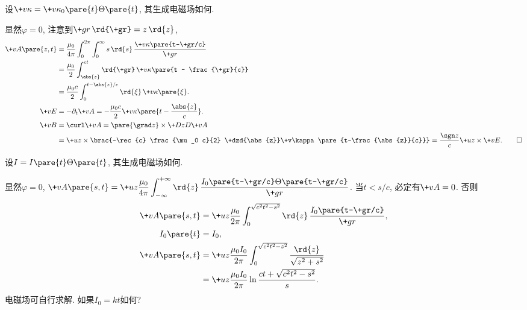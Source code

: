 \documentclass[hidelinks]{ctexart}
\begin{document}
\begin{sample}
    \begin{ex}
        设$\+v\kappa = \+v\kappa_0\pare{t}\Theta\pare{t}$, 其生成电磁场如何.
    \end{ex}
    \begin{solution}
        显然$\varphi = 0$, 注意到$\+gr\,\rd{\+gr} = z\,\rd{z}$,
        \begin{align*}
            \+vA\pare{z,t} &= \frac{\mu_0}{4\pi} \int_0^{2\pi} \int_0^\infty s\,\rd{s}\, \frac{\+v\kappa\pare{t-\+gr/c}}{\+gr} \\
            &= \frac{\mu_0}{2} \int_{\abs{z}}^{ct} \rd{\+gr}\, \+v\kappa\pare{t - \frac{\+gr}{c}} \\
            &= \frac{\mu_0 c}{2}\int_0^{t-\abs{z}/c} \rd{\xi}\,\+v\kappa\pare{\xi}. \\
            \+vE &= -\partial_t \+vA = -\frac{\mu_0 c}{2}\+v\kappa\pare{t-\frac{\abs{z}}{c}}. \\
            \+vB &= \curl \+vA = \pare{\grad z} \times \+DzD{\+vA}\\ &= \+uz\times \brac{-\rec{c} \frac{\mu_0 c}{2} \+dzd{\abs{z}}\+v\kappa\pare{t-\frac{\abs{z}}{c}}} = \frac{\sgn z}{c}\+uz\times \+vE. \qedhere
        \end{align*}
    \end{solution}
\end{sample}
\begin{sample}
    \begin{ex}
        设$I = I\pare{t}\Theta\pare{t}$, 其生成电磁场如何.
    \end{ex}
    \begin{solution}
        显然$\varphi = 0$, $\displaystyle \+vA\pare{s,t} = \+uz \frac{\mu_0}{4\pi} \int_{-\infty}^{+\infty} \rd{z}\, \frac{I_0\pare{t-\+gr/c}\Theta\pare{t-\+gr/c}}{\+gr}$. 当$t<s/c$, 必定有$\+vA = 0$. 否则
        \begin{align*}
            \+vA\pare{s,t} &= \+uz \frac{\mu_0}{2\pi} \int_0^{\sqrt{c^2t^2 - s^2}} \rd{z}\, \frac{I_0\pare{t-\+gr/c}}{\+gr}, \\
            I_0\pare{t} &= I_0, \\
            \+vA\pare{s,t} &= \+uz \frac{\mu_0I_0}{2\pi} \int_0^{\sqrt{c^2t^2 - z^2}} \frac{\rd{z}}{\sqrt{z^2+s^2}} \\
            &= \+uz \frac{\mu_0 I_0}{2\pi}\ln \frac{ct + \sqrt{c^2t^2 - s^2}}{s}.
        \end{align*}
        电磁场可自行求解. 如果$I_0 = kt$如何?
    \end{solution}
\end{sample}
\end{document}
